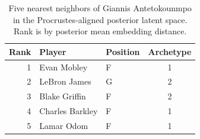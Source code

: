 \begin{table}[htbp]
  \centering\small
  \begin{tabular}{rllc}
    \toprule
    Rank & Player & Position & Archetype \\
    \midrule
    1 & Evan Mobley & F & 1 \\
    2 & LeBron James & G & 2 \\
    3 & Blake Griffin & F & 2 \\
    4 & Charles Barkley & F & 1 \\
    5 & Lamar Odom & F & 1 \\
    \bottomrule
  \end{tabular}
  \caption{Five nearest neighbors of Giannis Antetokounmpo in the Procrustes-aligned posterior latent space. Rank is by posterior mean embedding distance.}
  \label{tab:Giannis_Antetokounmpo_neighbors}
\end{table}

